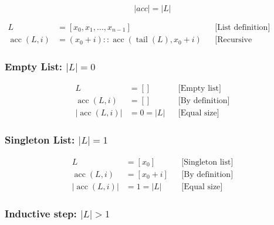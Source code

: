 \begin{equation*}
\lvert acc\rvert = \lvert L\rvert
\end{equation*}

\begin{equation*}
\begin{aligned}
L &= [x_0, x_1, \dots, x_{n-1}]
  && \text{[List definition]} \\
\operatorname{acc}(L, i) &= (x_0 + i) :: \operatorname{acc}(\operatorname{tail}(L), x_0 + i)
  && \text{[Recursive accumulation]}
\end{aligned}
\end{equation*}

\subsubsection*{Empty List: $\lvert L\rvert = 0$}

\begin{equation*}
\begin{aligned}
L &= []
  && \text{[Empty list]} \\
\operatorname{acc}(L, i) &= []
  && \text{[By definition]} \\
\lvert \operatorname{acc}(L, i)\rvert &= 0 = \lvert L\rvert
  && \text{[Equal size]}
\end{aligned}
\end{equation*}

\subsubsection*{Singleton List: $\lvert L\rvert = 1$}

\begin{equation*}
\begin{aligned}
L &= [x_0]
  && \text{[Singleton list]} \\
\operatorname{acc}(L, i) &= [x_0 + i]
  && \text{[By definition]} \\
\lvert \operatorname{acc}(L, i)\rvert &= 1 = \lvert L\rvert
  && \text{[Equal size]}
\end{aligned}
\end{equation*}

\subsubsection*{Inductive step: $\lvert L\rvert > 1$}

